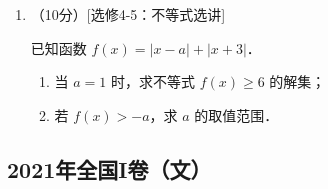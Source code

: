 \begin{description}
\begin{enumerate}[leftmargin=5pt]
        \item （10分）[选修4-5：不等式选讲]

        已知函数 $f(x)=|x-a|+|x+3|$．

        \begin{enumerate}[label=(\arabic*)]
            \item 当 $a=1$ 时，求不等式 $f(x)\geqslant6$ 的解集；
            \item 若 $f(x)>-a$，求 $a$ 的取值范围．
        \end{enumerate}
    \end{enumerate}
\end{description}
\clearpage


\subsection{2021年全国I卷（文）}\label{gk:2021年全国I卷（文）}

